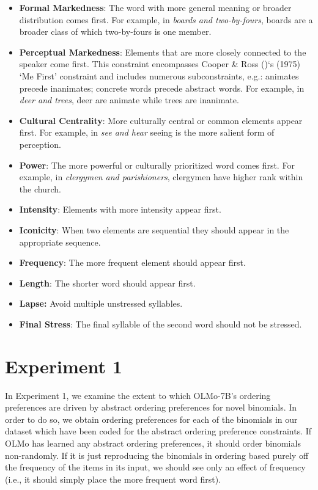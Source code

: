\documentclass[
  nottoc]{article}
\begin{document}
\begin{itemize}
\item
  \textbf{Formal Markedness}: The word with more general meaning or
  broader distribution comes first. For example, in \emph{boards and
  two-by-fours}, boards are a broader class of which two-by-fours is one
  member.
\item
  \textbf{Perceptual Markedness}: Elements that are more closely
  connected to the speaker come first. This constraint encompasses
  Cooper \& Ross ()`s (1975) `Me
  First' constraint and includes numerous subconstraints, e.g.: animates
  precede inanimates; concrete words precede abstract words. For
  example, in \emph{deer and trees}, deer are animate while trees are
  inanimate.
\item
  \textbf{Cultural Centrality}: More culturally central or common
  elements appear first. For example, in \emph{see and hear} seeing is
  the more salient form of perception.
\item
  \textbf{Power}: The more powerful or culturally prioritized word comes
  first. For example, in \emph{clergymen and parishioners}, clergymen
  have higher rank within the church.
\item
  \textbf{Intensity}: Elements with more intensity appear first.
\item
  \textbf{Iconicity}: When two elements are sequential they should
  appear in the appropriate sequence.
\item
  \textbf{Frequency}: The more frequent element should appear first.
\item
  \textbf{Length}: The shorter word should appear first.
\item
  \textbf{Lapse:} Avoid multiple unstressed syllables.
\item
  \textbf{Final Stress}: The final syllable of the second word should
  not be stressed.
\end{itemize}

\section{Experiment 1}\label{experiment-1}

In Experiment 1, we examine the extent to which OLMo-7B's ordering
preferences are driven by abstract ordering preferences for novel
binomials. In order to do so, we obtain ordering preferences for each of
the binomials in our dataset which have been coded for the abstract
ordering preference constraints. If OLMo has learned any abstract
ordering preferences, it should order binomials non-randomly. If it is
just reproducing the binomials in ordering based purely off the
frequency of the items in its input, we should see only an effect of
frequency (i.e., it should simply place the more frequent word first).
\end{document}
